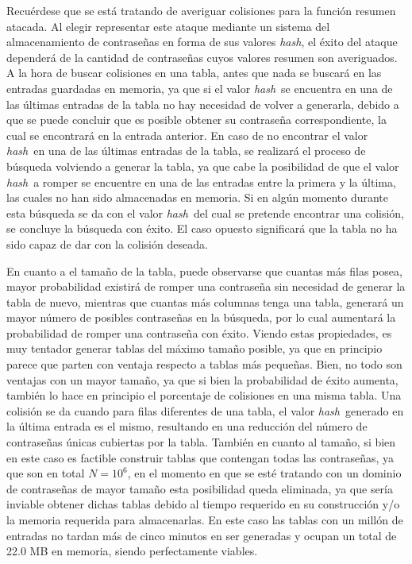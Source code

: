 \documentclass[12pt,spanish,listoffigures,listoftables,listofalgorithms]{tfgetsinf}
\newcommand{\hash}{\textit{hash}}
\begin{document}
Recuérdese que se está tratando de averiguar colisiones para la función resumen atacada. Al elegir representar este ataque mediante un sistema del almacenamiento de contraseñas en forma de sus valores \hash, el éxito del ataque dependerá de la cantidad de contraseñas cuyos valores resumen son averiguados. A la hora de buscar colisiones en una tabla, antes que nada se buscará en las entradas guardadas en memoria, ya que si el valor \hash~se encuentra en una de las últimas entradas de la tabla no hay necesidad de volver a generarla, debido a que se puede concluir que es posible obtener su contraseña correspondiente, la cual se encontrará en la entrada anterior. En caso de no encontrar el valor \hash~en una de las últimas entradas de la tabla, se realizará el proceso de búsqueda volviendo a generar la tabla, ya que cabe la posibilidad de que el valor \hash~a romper se encuentre en una de las entradas entre la primera y la última, las cuales no han sido almacenadas en memoria. Si en algún momento durante esta búsqueda se da con el valor \hash~del cual se pretende encontrar una colisión, se concluye la búsqueda con éxito. El caso opuesto significará que la tabla no ha sido capaz de dar con la colisión deseada.

En cuanto a el tamaño de la tabla, puede observarse que cuantas más filas posea, mayor probabilidad existirá de romper una contraseña sin necesidad de generar la tabla de nuevo, mientras que cuantas más columnas tenga una tabla, generará un mayor número de posibles contraseñas en la búsqueda, por lo cual aumentará la probabilidad de romper una contraseña con éxito. Viendo estas propiedades, es muy tentador generar tablas del máximo tamaño posible, ya que en principio parece que parten con ventaja respecto a tablas más pequeñas. Bien, no todo son ventajas con un mayor tamaño, ya que si bien la probabilidad de éxito aumenta, también lo hace en principio el porcentaje de colisiones en una misma tabla. Una colisión se da cuando para filas diferentes de una tabla, el valor \hash~generado en la última entrada es el mismo, resultando en una reducción del número de contraseñas únicas cubiertas por la tabla. También en cuanto al tamaño, si bien en este caso es factible construir tablas que contengan todas las contraseñas, ya que son en total $N = 10^6$, en el momento en que se esté tratando con un dominio de contraseñas de mayor tamaño esta posibilidad queda eliminada, ya que sería inviable obtener dichas tablas debido al tiempo requerido en su construcción y/o la memoria requerida para almacenarlas. En este caso las tablas con un millón de entradas no tardan más de cinco minutos en ser generadas y ocupan un total de 22.0 MB en memoria, siendo perfectamente viables.
\end{document}
